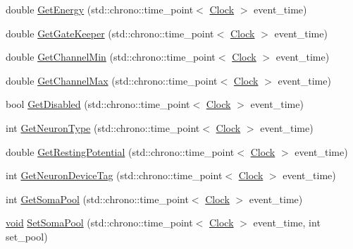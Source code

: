 \begin{DoxyCompactItemize}
\item 
double \mbox{\hyperlink{class_neuron_a91dd5325856e246d98c2864e1c955972}{Get\+Energy}} (std\+::chrono\+::time\+\_\+point$<$ \mbox{\hyperlink{universe_8h_a0ef8d951d1ca5ab3cfaf7ab4c7a6fd80}{Clock}} $>$ event\+\_\+time)
\item 
double \mbox{\hyperlink{class_neuron_a94accac3223afdecd1edf25e6db59ace}{Get\+Gate\+Keeper}} (std\+::chrono\+::time\+\_\+point$<$ \mbox{\hyperlink{universe_8h_a0ef8d951d1ca5ab3cfaf7ab4c7a6fd80}{Clock}} $>$ event\+\_\+time)
\item 
double \mbox{\hyperlink{class_neuron_a794c8fa270ea0600dab4fd13c25912fd}{Get\+Channel\+Min}} (std\+::chrono\+::time\+\_\+point$<$ \mbox{\hyperlink{universe_8h_a0ef8d951d1ca5ab3cfaf7ab4c7a6fd80}{Clock}} $>$ event\+\_\+time)
\item 
double \mbox{\hyperlink{class_neuron_ae8b6c47bebe302e62721dc4a6e447ca2}{Get\+Channel\+Max}} (std\+::chrono\+::time\+\_\+point$<$ \mbox{\hyperlink{universe_8h_a0ef8d951d1ca5ab3cfaf7ab4c7a6fd80}{Clock}} $>$ event\+\_\+time)
\item 
bool \mbox{\hyperlink{class_neuron_adfee1a62df820344b84fe2020451b24f}{Get\+Disabled}} (std\+::chrono\+::time\+\_\+point$<$ \mbox{\hyperlink{universe_8h_a0ef8d951d1ca5ab3cfaf7ab4c7a6fd80}{Clock}} $>$ event\+\_\+time)
\item 
int \mbox{\hyperlink{class_neuron_a98f326ea86e6e8371b639609a4495c37}{Get\+Neuron\+Type}} (std\+::chrono\+::time\+\_\+point$<$ \mbox{\hyperlink{universe_8h_a0ef8d951d1ca5ab3cfaf7ab4c7a6fd80}{Clock}} $>$ event\+\_\+time)
\item 
double \mbox{\hyperlink{class_neuron_a0573244d3c78a22a45c249db536cbb68}{Get\+Resting\+Potential}} (std\+::chrono\+::time\+\_\+point$<$ \mbox{\hyperlink{universe_8h_a0ef8d951d1ca5ab3cfaf7ab4c7a6fd80}{Clock}} $>$ event\+\_\+time)
\item 
int \mbox{\hyperlink{class_neuron_aff3a33f5d8ef5dacdec9c03df50f168c}{Get\+Neuron\+Device\+Tag}} (std\+::chrono\+::time\+\_\+point$<$ \mbox{\hyperlink{universe_8h_a0ef8d951d1ca5ab3cfaf7ab4c7a6fd80}{Clock}} $>$ event\+\_\+time)
\item 
int \mbox{\hyperlink{class_neuron_aa6f1237ed89c48eb57610083edf43efa}{Get\+Soma\+Pool}} (std\+::chrono\+::time\+\_\+point$<$ \mbox{\hyperlink{universe_8h_a0ef8d951d1ca5ab3cfaf7ab4c7a6fd80}{Clock}} $>$ event\+\_\+time)
\item 
\mbox{\hyperlink{glad_8h_a950fc91edb4504f62f1c577bf4727c29}{void}} \mbox{\hyperlink{class_neuron_ae18e23983d02953fa6886bef0bbeb339}{Set\+Soma\+Pool}} (std\+::chrono\+::time\+\_\+point$<$ \mbox{\hyperlink{universe_8h_a0ef8d951d1ca5ab3cfaf7ab4c7a6fd80}{Clock}} $>$ event\+\_\+time, int set\+\_\+pool)

\end{DoxyCompactItemize}
